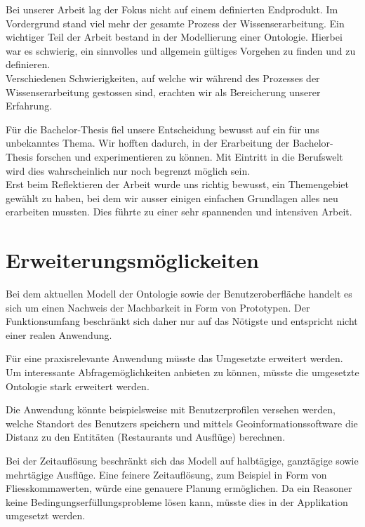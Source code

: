 Bei unserer Arbeit lag der Fokus nicht auf einem definierten Endprodukt. Im Vordergrund stand viel mehr der gesamte Prozess der Wissenserarbeitung. Ein wichtiger Teil der Arbeit bestand in der Modellierung einer Ontologie. Hierbei war es schwierig, ein sinnvolles und allgemein gültiges Vorgehen zu finden und zu definieren.\\
Verschiedenen Schwierigkeiten, auf welche wir während des Prozesses der Wissenserarbeitung gestossen sind, erachten wir als Bereicherung unserer Erfahrung.

Für die Bachelor-Thesis fiel unsere Entscheidung bewusst auf ein für uns unbekanntes Thema. Wir hofften dadurch, in der Erarbeitung der Bachelor-Thesis forschen und experimentieren zu können. Mit Eintritt in die Berufswelt wird dies wahrscheinlich nur noch begrenzt möglich sein.\\
Erst beim Reflektieren der Arbeit wurde uns richtig bewusst, ein Themengebiet gewählt zu haben, bei dem wir ausser einigen einfachen Grundlagen alles neu erarbeiten mussten. Dies führte zu einer sehr spannenden und intensiven Arbeit.


\section{Erweiterungsmöglickeiten}
\label{sec:fazit_subchap}
Bei dem aktuellen Modell der Ontologie sowie der Benutzeroberfläche handelt es sich um einen Nachweis der Machbarkeit in Form von Prototypen. Der Funktionsumfang beschränkt sich daher nur auf das Nötigste und entspricht nicht einer realen Anwendung.

Für eine praxisrelevante Anwendung müsste das Umgesetzte erweitert werden. Um interessante Abfragemöglichkeiten anbieten zu können, müsste die umgesetzte Ontologie stark erweitert werden.

Die Anwendung könnte beispielsweise mit Benutzerprofilen versehen werden, welche Standort des Benutzers speichern und mittels Geoinformationssoftware die Distanz zu den Entitäten (Restaurants und Ausflüge) berechnen.

Bei der Zeitauflösung beschränkt sich das Modell auf halbtägige, ganztägige sowie mehrtägige Ausflüge. Eine feinere Zeitauflösung, zum Beispiel in Form von Fliesskommawerten, würde eine genauere Planung ermöglichen. Da ein Reasoner keine Bedingungserfüllungsprobleme lösen kann, müsste dies in der Applikation umgesetzt werden.
